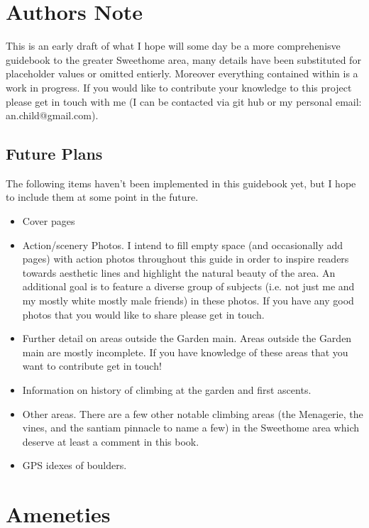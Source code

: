 \section{Authors Note}
This is an early draft of what I hope will some day be a more comprehenisve guidebook to the greater Sweethome area, many details have been substituted for placeholder values or omitted entierly. Moreover everything contained within is a work in progress. If you would like to contribute your knowledge to this project please get in touch with me (I can be contacted via git hub or my personal email: an.child@gmail.com).
\subsection*{Future Plans}
The following items haven't been implemented in this guidebook yet, but I hope to include them at some point in the future.
\begin{itemize}
\item Cover pages\\
\item Action/scenery Photos. I intend to fill empty space (and occasionally add pages) with action photos throughout this guide in order to inspire readers towards aesthetic lines and highlight the natural beauty of the area. An additional goal is to feature a diverse group of subjects (i.e. not just me and my mostly white mostly male friends) in these photos. If you have any good photos that you would like to share please get in touch.\\
\item Further detail on areas outside the Garden main. Areas outside the Garden main are mostly incomplete. If you have knowledge of these areas that you want to contribute get in touch!\\
\item Information on history of climbing at the garden and first ascents.\\
\item Other areas. There are a few other notable climbing areas (the Menagerie, the vines, and the santiam pinnacle to name a few) in the Sweethome area which deserve at least a comment in this book.
\item GPS idexes of boulders.\\
\end{itemize}
\section{Ameneties}
